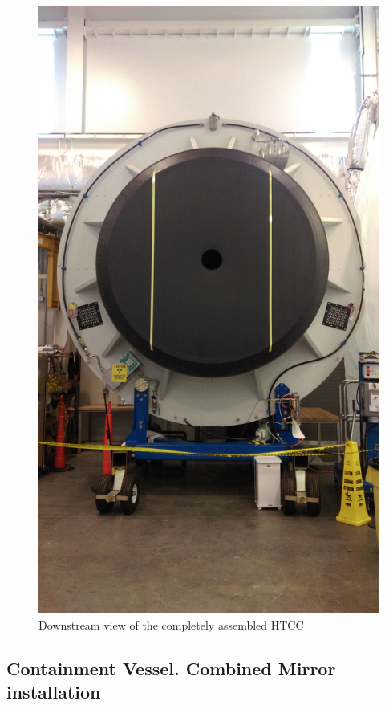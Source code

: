 \begin{figure}[h]
    \centering
    \includegraphics[width=1.0\linewidth,trim={0 25cm 0 500},clip]{images/Exit_Win.jpg}
    \caption{Downstream view of the completely assembled HTCC}
    \label{fig:Exit_Win}
\end{figure}

\subsection{Containment Vessel. Combined Mirror installation}

